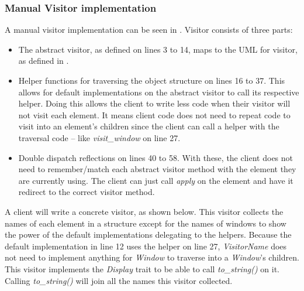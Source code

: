 
\subsubsection{Manual Visitor implementation}
\label{sec:visitor-manual-implementation}
A manual visitor implementation can be seen in .
Visitor consists of three parts:
\begin{itemize}
	\item The abstract visitor, as defined on lines 3 to 14, maps to the UML for visitor, as defined in .
	\item Helper functions for traversing the object structure \cite{gamma_94_01} on lines 16 to 37.
	      This allows for default implementations on the abstract visitor to call its respective helper.
	      Doing this allows the client to write less code when their visitor will not visit each element.
	      It means client code does not need to repeat code to visit into an element's children since the client can call a helper with the traversal code -- like \textit{visit\_window} on line 27.
	\item Double dispatch reflections on lines 40 to 58.
	      With these, the client does not need to remember/match each abstract visitor method with the element they are currently using.
	      The client can just call \textit{apply} on the element and have it redirect to the correct visitor method.
\end{itemize}


A client will write a concrete visitor, as shown below.
This visitor collects the names of each element in a structure except for the names of windows to show the power of the default implementations delegating to the helpers.
Because the default implementation in  line 12 uses the helper on line 27, \textit{VisitorName} does not need to implement anything for \textit{Window} to traverse into a \textit{Window}'s children.
This visitor implements the \textit{Display} trait to be able to call \textit{to\_string()} on it.
Calling \textit{to\_string()} will join all the names this visitor collected.


